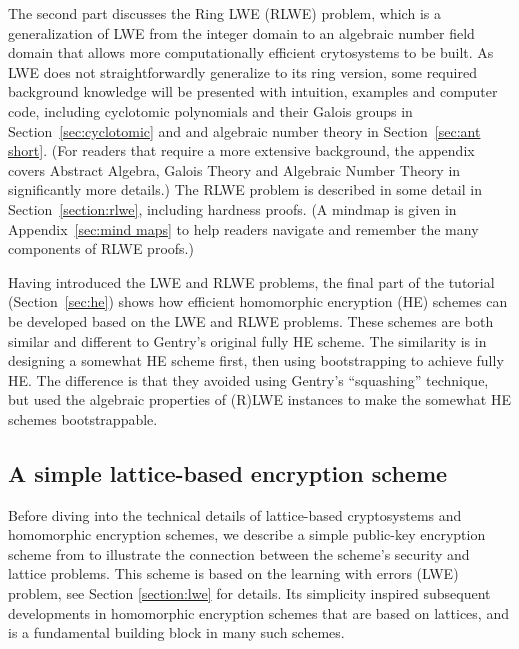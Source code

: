 \documentclass[../main.tex]{subfiles}
\begin{document}

The second part discusses the Ring LWE (RLWE) problem, which is a generalization of LWE from the integer domain to an algebraic number field domain that allows more computationally efficient crytosystems to be built. %
As LWE does not straightforwardly generalize to its ring version, some required background knowledge will be presented with intuition, examples and computer code, including cyclotomic polynomials and their Galois groups in Section~\ref{sec:cyclotomic} and and algebraic number theory in Section~\ref{sec:ant short}.
(For readers that require a more extensive background, the appendix covers Abstract Algebra, Galois Theory and Algebraic Number Theory in significantly more details.)
The RLWE problem is described in some detail in Section~\ref{section:rlwe}, including hardness proofs.
(A mindmap is given in Appendix~\ref{sec:mind maps} to help readers navigate and remember the many components of RLWE proofs.)

Having introduced the LWE and RLWE problems, the final part of the tutorial (Section~\ref{sec:he}) shows how efficient homomorphic encryption (HE) schemes can be developed based on the LWE and RLWE problems.
These schemes are both similar and different to Gentry's  original fully HE scheme. The similarity is in designing a somewhat HE scheme first, then using bootstrapping to achieve fully HE. The difference is that they avoided using Gentry's ``squashing'' technique, but used the algebraic properties of (R)LWE instances to make the somewhat HE schemes bootstrappable.  




\subsection{A simple lattice-based encryption scheme}\label{subsec:regev scheme}

Before diving into the technical details of lattice-based cryptosystems and homomorphic encryption schemes, we describe a simple public-key encryption scheme from \cite{regev2009lattices} to illustrate the connection between the scheme's security and lattice problems. This scheme is based on the learning with errors (LWE) problem, see Section \ref{section:lwe} for details. Its simplicity inspired subsequent developments in homomorphic encryption schemes that are based on lattices, and is a fundamental building block in many such schemes. 
\end{document}
